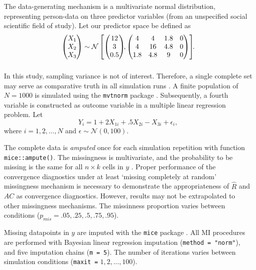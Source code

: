 \documentclass[Royal,times,sageh]{sagej}
\begin{document}
The data-generating mechanism is a multivariate normal distribution,
representing person-data on three predictor variables (from an
unspecified social scientific field of study). Let our predictor space
be defined as \begin{align*}
\begin{pmatrix}X_1\\
X_2\\
X_3
\end{pmatrix} \sim \mathcal{N}
\begin{bmatrix}
\begin{pmatrix}
12\\
3\\
0.5
\end{pmatrix}\!\!,
\begin{pmatrix}
4 & 4 & 1.8 & 0\\
4 & 16 & 4.8 & 0\\
1.8 & 4.8 & 9 & 0
\end{pmatrix}
\end{bmatrix}\!\!\text{.}\\[2\jot]
\end{align*}

In this study, sampling variance is not of interest. Therefore, a single
complete set may serve as comparative truth in all simulation runs
\citep{vink14}. A finite population of \(N=1000\) is simulated using the
\texttt{mvtnorm} package \citep{mvtnorm}. Subsequently, a fourth
variable is constructed as outcome variable in a multiple linear
regression problem. Let \[
Y_i = 1 + 2X_{1i} +.5X_{2i} - X_{3i} + \epsilon_i ,
\] where \(i = 1, 2,..., N\) and \(\epsilon \sim \mathcal{N}(0, 100)\).

The complete data is \emph{amputed} once for each simulation repetition
with function \texttt{mice::ampute()}. The missingness is multivariate,
and the probability to be missing is the same for all \(n \times k\)
cells in \(y\) \citep[`MCAR';][]{rubin87}. Proper performance of the
convergence diagnostics under at least `missing completely at random'
missingness mechanism is necessary to demonstrate the appropriateness of
\(\widehat{R}\) and \(AC\) as convergence diagnostics. However, results
may not be extrapolated to other missingness mechanisms. The missinness
proportion varies between conditions (\(p_{mis} =.05,.25,.5,.75,.95\)).

Missing datapoints in \(y\) are imputed with the \texttt{mice} package
\citep{mice}. All MI procedures are performed with Bayesian linear
regression imputation (\texttt{method\ =\ "norm"}), and five imputation
chains (\texttt{m\ =\ 5}). The number of iterations varies between
simulation conditions (\texttt{maxit\ =} \(1, 2, \dots, 100\)).
\end{document}
